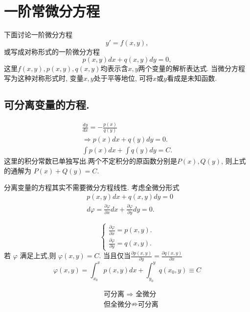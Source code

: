 \section{一阶常微分方程}
下面讨论一阶微分方程
\begin{equation}
    y' = f(x,y),
\end{equation}
或写成对称形式的一阶微分方程
\begin{equation}
    p(x,y) dx + q(x,y) dy = 0,
\end{equation}
这里$f(x,y), p(x,y), q(x,y)$均表示含$x,y$两个变量的解析表达式. 当微分方程写为这种对称形式时,
变量$x,y$处于平等地位, 可将$x$或$y$看成是未知函数.
\subsection{可分离变量的方程.}
$$
\begin{gathered}
\frac{d y}{d x}=-\frac{p(x)}{q(y)} \\
\Rightarrow p(x) d x+q(y) d y=0 . \\
\int p(x) d x+\int q(y) d y=C .
\end{gathered}
$$
这里的积分常数已单独写出.两个不定积分的原函数分别是$P(x), Q(y)$, 则上式的通解为
$P(x) + Q(y) = C$.

分离变量的方程其实不需要微分方程线性.
考虑全微分形式
$$
\begin{aligned}
& p(x, y) d x+q(x, y) d y=0 \\
& d \varphi=\frac{\partial \varphi}{\partial x} d x+\frac{\partial \varphi}{\partial y} d y=0 .
\end{aligned}
$$

$$
\left\{\begin{array}{l}
\frac{\partial \varphi}{\partial x}=p(x, y) . \\
\frac{\partial \varphi}{\partial y}=q(x, y) .
\end{array}\right.
$$
若 $\varphi$ 满足上式,则 $\varphi(x, y)=C$.
当且仅当$\frac{\partial p(x, y)}{\partial y} = \frac{\partial q(x, y)}{\partial x}$
\begin{equation}
\varphi(x, y)=\int_{x_0}^x p(x, y) d x+\int_{y_0}^y q(x_0, y) \equiv C  
\end{equation}

$$
\begin{aligned}
    & \text { 可分离 } \Rightarrow \text { 全微分 } \\
    & \text { 但全微分} \nRightarrow \text{可分离} \\
\end{aligned}
$$


